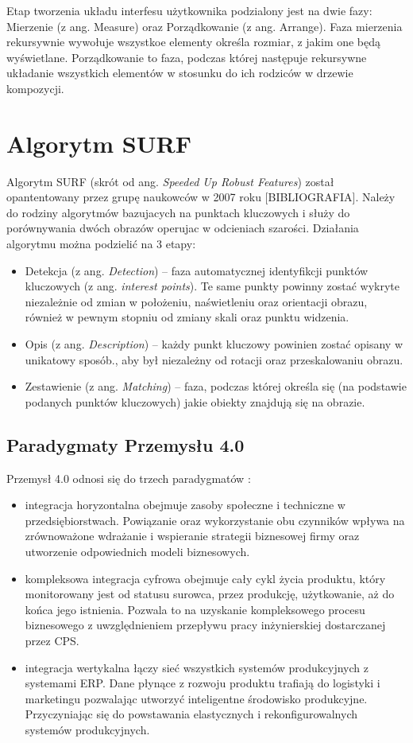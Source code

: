 Etap tworzenia układu interfesu użytkownika podzialony jest na dwie fazy: Mierzenie (z ang. Measure) oraz Porządkowanie (z ang. Arrange). Faza mierzenia rekursywnie wywołuje wszystkoe elementy określa rozmiar, z jakim one będą wyświetlane. Porządkowanie to faza, podczas której następuje rekursywne układanie wszystkich elementów w stosunku do ich rodziców w drzewie kompozycji. 


\section{Algorytm SURF}
Algorytm SURF (skrót od ang. \textit{Speeded Up Robust Features}) został opantentowany przez grupę naukowców w 2007 roku [BIBLIOGRAFIA]. Należy do rodziny algorytmów bazujacych na punktach kluczowych i służy do porównywania dwóch obrazów operujac w odcieniach szarości. Działania algorytmu można podzielić na 3 etapy:

\begin{itemize}
	\item Detekcja (z ang. \textit{Detection}) – faza automatycznej identyfikcji punktów kluczowych (z ang. \textit{interest points}). Te same punkty powinny zostać wykryte niezależnie od zmian w położeniu, naświetleniu oraz orientacji obrazu, również w pewnym stopniu od zmiany skali oraz punktu widzenia. 
	\item Opis (z ang. \textit{Description}) – każdy punkt kluczowy powinien zostać opisany w unikatowy sposób., aby był niezależny od rotacji oraz przeskalowaniu obrazu.
	\item Zestawienie (z ang. \textit{Matching}) – faza, podczas której określa się (na podstawie podanych punktów kluczowych) jakie obiekty znajdują się na obrazie. 
\end{itemize}



\subsection{Paradygmaty Przemysłu 4.0}

Przemysł 4.0 odnosi się do trzech paradygmatów \cite{StockIndustry}:
\begin{itemize}
	\item integracja horyzontalna obejmuje zasoby społeczne i techniczne w przedsiębiorstwach. Powiązanie oraz wykorzystanie obu czynników wpływa na zrównoważone wdrażanie i wspieranie strategii biznesowej firmy oraz utworzenie odpowiednich modeli biznesowych. 		
	\item kompleksowa integracja cyfrowa obejmuje cały cykl życia produktu, który monitorowany jest od statusu surowca, przez produkcję, użytkowanie, aż do końca jego istnienia. Pozwala to na uzyskanie kompleksowego procesu biznesowego z uwzględnieniem przepływu pracy inżynierskiej dostarczanej przez CPS. 	
	\item integracja wertykalna łączy sieć wszystkich systemów produkcyjnych z systemami ERP. Dane płynące z rozwoju produktu trafiają do logistyki i marketingu pozwalając utworzyć inteligentne środowisko produkcyjne. Przyczyniając się do powstawania elastycznych i rekonfigurowalnych systemów produkcyjnych.
\end{itemize}

